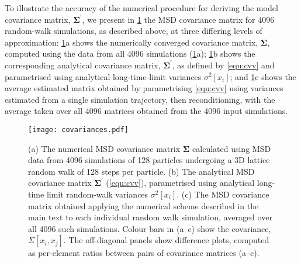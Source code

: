 \documentclass[reprint,superscriptaddress,nobibnotes,amsmath,amssymb,aps,prx,hidelinks]{revtex4-2}
\newcommand{\oMSDi}{\ensuremath{x_i}}
\newcommand{\oMSDj}{\ensuremath{x_j}}
\newcommand{\var}[1]{\ensuremath{\sigma^2[#1]}}
\begin{document}
To illustrate the accuracy of the numerical procedure for deriving the model covariance matrix, $\bm{\Sigma^\prime}$, we present in \cref{fig:covariances} the MSD covariance matrix for \num{4096} random-walk simulations, as described above, at three differing levels of approximation:
\cref{fig:covariances}a shows the numerically converged covariance matrix, $\bm{\Sigma}$, computed using the data from all \num{4096} simulations (\cref{fig:covariances}a); \cref{fig:covariances}b shows the corresponding analytical covariance matrix, $\mathbf{\Sigma^\prime}$, as defined by \cref{equ:cvv} and parametrised using analytical long-time-limit variances $\var{\oMSDi}$; and \cref{fig:covariances}c shows the average estimated matrix obtained by parametrising \cref{equ:cvv} using variances estimated from a single simulation trajectory, then reconditioning, with the average taken over all \num{4096} matrices obtained from the \num{4096} input simulations. 
\begin{figure}
    \centering
    \texttt{[image: covariances.pdf]}
    \caption{
        (a) The numerical MSD covariance matrix $\bm{\Sigma}$ calculated using MSD data from \num{4096} simulations of \num{128} particles undergoing a 3D lattice random walk of \num{128} steps per particle.
        (b) The analytical MSD covariance matrix $\bm{\Sigma^\prime}$ (\cref{equ:cvv}), parametrised using analytical long-time limit random-walk variances $\var{\oMSDi}$.
        (c) The MSD covariance matrix obtained applying the numerical scheme described in the main text to each individual random walk simulation, averaged over all \num{4096} such simulations.
        Colour bars in (a--c) show the covariance, $\Sigma\left[\oMSDi, \oMSDj\right]$.
        The off-diagonal panels show difference plots, computed as per-element ratios between pairs of covariance matrices (a--c).
    }
    \label{fig:covariances}
\end{figure}
\end{document}
